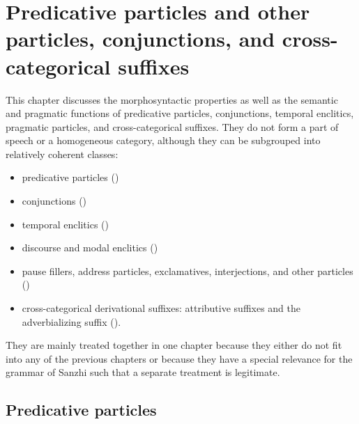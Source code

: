 \chapter{Predicative particles and other particles, conjunctions, and cross-categorical suffixes}
\label{cpt:Minor parts of speech}

This chapter discusses the morphosyntactic properties as well as the semantic and pragmatic functions of predicative particles, conjunctions, temporal enclitics, pragmatic particles, and cross-categorical suffixes. They do not form a part of speech or a homogeneous category, although they can be subgrouped into relatively coherent classes:

{\sloppy\begin{itemize}
	\item	predicative particles ()
	\item	{}conjunctions ()
	\item  temporal enclitics ()
	\item	discourse and modal enclitics ()
	\item	pause fillers, address particles, exclamatives, interjections, and other particles ()
	\item	cross-categorical derivational suffixes: attributive suffixes and the adverbializing suffix ().
\end{itemize}}

They are mainly treated together in one chapter because they either do not fit into any of the previous chapters or because they have a special relevance for the grammar of Sanzhi such that a separate treatment is legitimate.

\section{Predicative particles}
\label{sec:Predicative particles}

